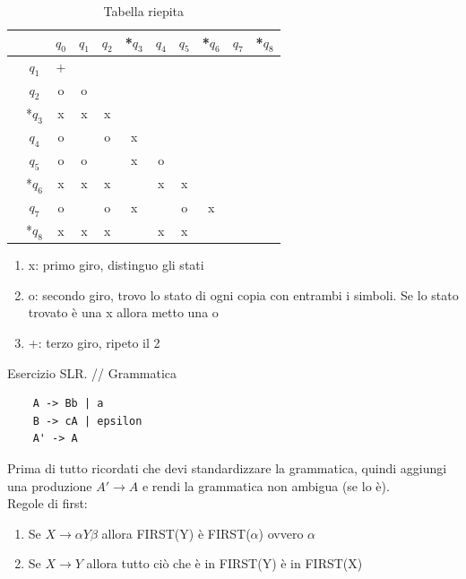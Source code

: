 \begin{enumerate}
      \begin{table}[ht]
          \centering
          \begin{tabular}{c c| c | c | c | c | c | c | c | c | c}
              && $q_0$ & $q_1$ & $q_2$ & *$q_3$ & $q_4$ & $q_5$ & *$q_6$ & $q_7$ & *$q_8$ \\
              \hline
              & $q_1$ &+\\
              \hline
              & $q_2$ &o&o\\
              \hline
              &*$q_3$ &x&x&x\\
              \hline
              & $q_4$ &o& &o&x\\
              \hline
              & $q_5$ &o&o& &x&o\\
              \hline
              &*$q_6$ &x&x&x& &x&x\\
              \hline
              & $q_7$ &o& &o&x& &o&x\\
              \hline
              &*$q_8$ &x&x&x& &x&x& & \\
          \end{tabular}
          \caption{Tabella riepita}
      \end{table}
      \begin{enumerate}
          \item x: primo giro, distinguo gli stati 
          \item o: secondo giro, trovo lo stato di ogni copia con entrambi i simboli. Se lo stato trovato è una x allora metto una o
          \item +: terzo giro, ripeto il 2
      \end{enumerate}
\end{enumerate}

Esercizio SLR.
// Grammatica
\begin{verbatim}
    A -> Bb | a
    B -> cA | epsilon
    A' -> A
\end{verbatim}
Prima di tutto ricordati che devi standardizzare la grammatica, quindi aggiungi 
una produzione $A' \rightarrow A$ e rendi la grammatica non ambigua (se lo è).
\\ Regole di first:
\begin{enumerate}
    \item Se $X \rightarrow \alpha Y \beta$ allora FIRST(Y) è FIRST($\alpha$) ovvero $\alpha$
    \item Se $X \rightarrow Y$ allora tutto ciò che è in FIRST(Y) è in FIRST(X)
\end{enumerate}

